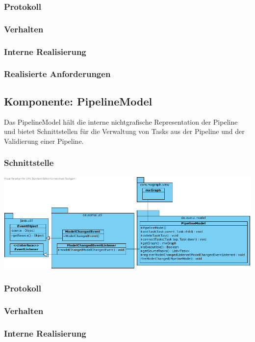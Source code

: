 \documentclass[a4paper,12pt]{scrartcl}
\begin{document}
\subsubsection{Protokoll}
\subsubsection{Verhalten}
\subsubsection{Interne Realisierung}
\subsubsection{Realisierte Anforderungen}

\newpage
\subsection{Komponente: PipelineModel}
Das PipelineModel hält die interne nichtgrafische Representation der Pipeline und bietet Schnittstellen für die Verwaltung von Tasks aus der Pipeline und der Validierung einer Pipeline. 
\subsubsection{Schnittstelle}
\begin{center}
\includegraphics[width=17cm]{Schnittstelle_PipelineModel.png}
\end{center}
\subsubsection{Protokoll}
\subsubsection{Verhalten}
\subsubsection{Interne Realisierung}
\end{document}
